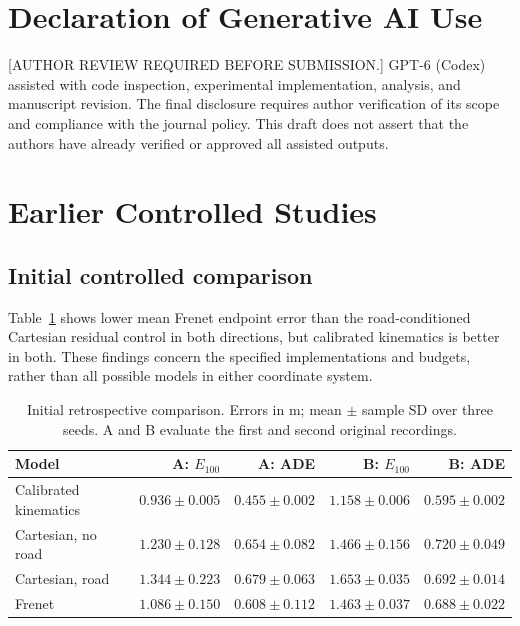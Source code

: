 \documentclass[preprint,12pt]{elsarticle}
\begin{document}
\section*{Declaration of Generative AI Use}
[AUTHOR REVIEW REQUIRED BEFORE SUBMISSION.] GPT-6 (Codex) assisted with code
inspection, experimental implementation, analysis, and manuscript revision.
The final disclosure requires author verification of its scope and compliance
with the journal policy. This draft does not assert that the authors have
already verified or approved all assisted outputs.

\appendix

\section{Earlier Controlled Studies}\label{sec:development}
\subsection{Initial controlled comparison}\label{sec:donkeyreal_results}
Table~\ref{tab:controlled} shows lower mean Frenet endpoint error than the
road-conditioned Cartesian residual control in both directions, but calibrated
kinematics is better in both. These findings concern the specified implementations
and budgets, rather than all possible models in either coordinate system.
\begin{table}[t]
\centering
\caption{Initial retrospective comparison. Errors in m; mean $\pm$ sample SD over three seeds. A and B evaluate the first and second original recordings.}
\label{tab:controlled}
\footnotesize
\setlength{\tabcolsep}{3pt}
\begin{tabular}{lrrrr}
\toprule
Model & A: $E_{100}$ & A: ADE & B: $E_{100}$ & B: ADE \\
\midrule
Calibrated kinematics & $0.936 \pm 0.005$ & $0.455 \pm 0.002$ & $1.158 \pm 0.006$ & $0.595 \pm 0.002$ \\
Cartesian, no road & $1.230 \pm 0.128$ & $0.654 \pm 0.082$ & $1.466 \pm 0.156$ & $0.720 \pm 0.049$ \\
Cartesian, road & $1.344 \pm 0.223$ & $0.679 \pm 0.063$ & $1.653 \pm 0.035$ & $0.692 \pm 0.014$ \\
Frenet & $1.086 \pm 0.150$ & $0.608 \pm 0.112$ & $1.463 \pm 0.037$ & $0.688 \pm 0.022$ \\
\bottomrule
\end{tabular}
\end{table}
\end{document}
